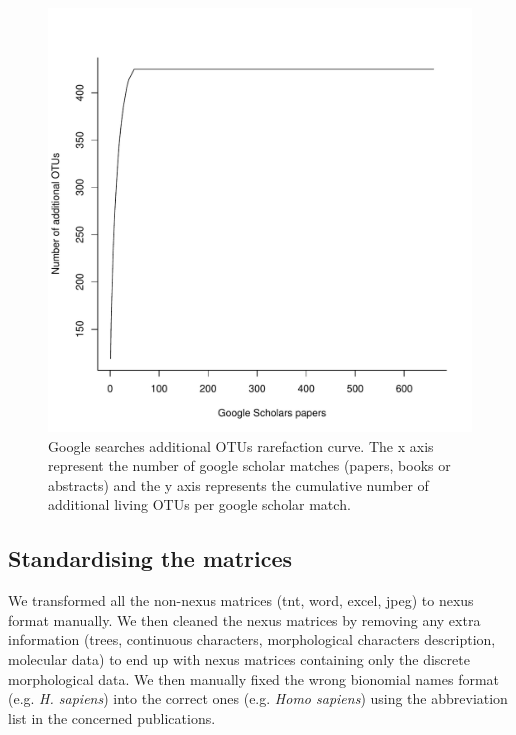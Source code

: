 \begin{figure}[!htbp]
\centering
    \includegraphics[width=1\textwidth]{Supplementary/Supp_figure_google_searches.pdf}
\caption{Google searches additional OTUs rarefaction curve. The x axis represent the number of google scholar matches (papers, books or abstracts) and the y axis represents the cumulative number of additional living OTUs per google scholar match.}
\label{Supp_figure_google_searches}
\end{figure}

\subsection{Standardising the matrices}
We transformed all the non-nexus matrices (tnt, word, excel, jpeg) to nexus format manually. We then cleaned the nexus matrices by removing any extra information (trees, continuous characters, morphological characters description, molecular data) to end up with nexus matrices containing only the discrete morphological data. We then manually fixed the wrong bionomial names format (e.g. \textit{H. sapiens}) into the correct ones (e.g. \textit{Homo sapiens}) using the abbreviation list in the concerned publications. 

